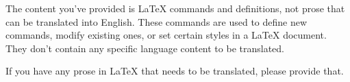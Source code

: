 The content you've provided is LaTeX commands and definitions, not prose that can be translated into English. These commands are used to define new commands, modify existing ones, or set certain styles in a LaTeX document. They don't contain any specific language content to be translated. 

If you have any prose in LaTeX that needs to be translated, please provide that.
